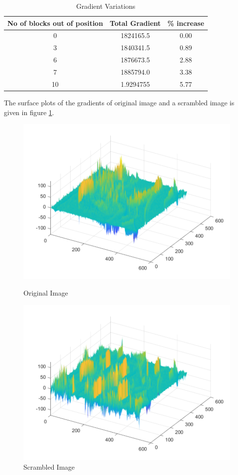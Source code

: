 \documentclass[journal, compsoc]{IEEEtran}
\begin{document}
\begin{table}[!h]
\renewcommand{\arraystretch}{1.3}
\caption{Gradient Variations}
\label{tab:grad}
\centering
\begin{tabular}{c||c||c}
\hline
\bfseries No of blocks out of position & \bfseries Total Gradient & \bfseries \% increase\\
\hline\hline
0 & 1824165.5 & 0.00\\
3 & 1840341.5 & 0.89\\
6 & 1876673.5 & 2.88\\
7 & 1885794.0 & 3.38\\
10 & 1.9294755 & 5.77\\
\hline
\end{tabular}
\end{table}

The surface plots of the gradients of original image and a scrambled image is given in figure \ref{img:scr}.

\begin{figure}[!h]
\label{img:scr}
  \includegraphics[width=\linewidth]{less_scrambled_gradient.pdf}
  \caption{Original Image}
\endminipage\hfill
{}
  \includegraphics[width=\linewidth]{scrambled_gradient.pdf}
  \caption{Scrambled Image}
\endminipage
\end{figure}
\end{document}
